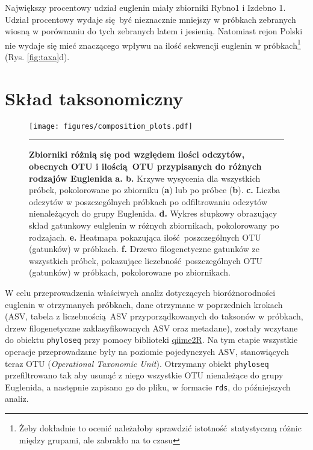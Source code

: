\documentclass[two column, twoside, a4paper]{article}
\begin{document}
Największy procentowy udział euglenin miały zbiorniki Rybno1 i Izdebno 1. Udział procentowy wydaje się być nieznacznie mniejszy w próbkach zebranych wiosną w porównaniu do tych zebranych latem i jesienią. Natomiast rejon Polski nie wydaje się mieć znaczącego wpływu na ilość sekwencji euglenin w próbkach\footnote{Żeby dokładnie to ocenić należałoby sprawdzić istotność statystyczną różnic między grupami, ale zabrakło na to czasu} (Rys. \ref{fig:taxa}d).


\section{Skład taksonomiczny}

\begin{figure*}[t]
  \begin{center}
    \texttt{[image: figures/composition\_plots.pdf]}
  \end{center}

  \hrule width0.5\textwidth \vspace{0.35em}

  \caption{
    \textbf{Zbiorniki różnią się pod względem ilości odczytów, obecnych OTU i ilością OTU przypisanych do różnych rodzajów Euglenida} 
    \textbf{a. b.} Krzywe wysycenia dla wszystkich próbek, pokolorowane po zbiorniku (\textbf{a}) lub po próbce (\textbf{b}).
    \textbf{c.} Liczba odczytów w poszczególnych próbkach po odfiltrowaniu odczytów nienależących do grupy Euglenida.
    \textbf{d.} Wykres słupkowy obrazujący skład gatunkowy eulglenin w różnych zbiornikach, pokolorowany po rodzajach.
    \textbf{e.} Heatmapa pokazująca ilość poszczególnych OTU (gatunków) w próbkach.
    \textbf{f.} Drzewo filogenetyczne gatunków ze wszystkich próbek, pokazujące liczebność poszczególnych OTU (gatunków) w próbkach, pokolorowane po zbiornikach.
  }
  \label{fig:taxa_composition}
\end{figure*}

W celu przeprowadzenia właściwych analiz dotyczących bioróżnorodności euglenin w otrzymanych próbkach, dane otrzymane w poprzednich krokach (ASV, tabela z liczebnością ASV przyporządkowanych do taksonów w próbkach, drzew filogenetyczne zaklasyfikowanych ASV oraz metadane), zostały wczytane do obiektu \texttt{phyloseq} przy pomocy biblioteki \href{https://github.com/jbisanz/qiime2R/}{qiime2R}. Na tym etapie wszystkie operacje przeprowadzane były na poziomie pojedynczych ASV, stanowiących teraz OTU (\textit{Operational Taxonomic Unit}). Otrzymany obiekt \texttt{phyloseq} przefiltrowano tak aby usunąć z niego wszystkie OTU nienależące do grupy Euglenida, a następnie zapisano go do pliku, w formacie \texttt{rds}, do późniejszych analiz.
\end{document}
